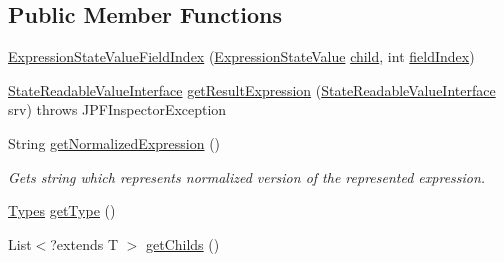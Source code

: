 \subsection*{Public Member Functions}
\begin{DoxyCompactItemize}
\item 
\hyperlink{classgov_1_1nasa_1_1jpf_1_1inspector_1_1server_1_1expression_1_1expressions_1_1_expression_state_value_field_index_ac1c21fbe3db4e864eca080940150d01b}{Expression\+State\+Value\+Field\+Index} (\hyperlink{classgov_1_1nasa_1_1jpf_1_1inspector_1_1server_1_1expression_1_1expressions_1_1_expression_state_value}{Expression\+State\+Value} \hyperlink{classgov_1_1nasa_1_1jpf_1_1inspector_1_1server_1_1expression_1_1_expression_state_unary_operator_a66041b1f569a361549e28a00f7ca5f2f}{child}, int \hyperlink{classgov_1_1nasa_1_1jpf_1_1inspector_1_1server_1_1expression_1_1expressions_1_1_expression_state_value_field_index_a73e1be57f920f5d0fd849d0d734ccf6a}{field\+Index})
\item 
\hyperlink{interfacegov_1_1nasa_1_1jpf_1_1inspector_1_1server_1_1programstate_1_1_state_readable_value_interface}{State\+Readable\+Value\+Interface} \hyperlink{classgov_1_1nasa_1_1jpf_1_1inspector_1_1server_1_1expression_1_1expressions_1_1_expression_state_value_field_index_a7e66eb5e8b5055f000db75aeecae7c35}{get\+Result\+Expression} (\hyperlink{interfacegov_1_1nasa_1_1jpf_1_1inspector_1_1server_1_1programstate_1_1_state_readable_value_interface}{State\+Readable\+Value\+Interface} srv)  throws J\+P\+F\+Inspector\+Exception 
\item 
String \hyperlink{classgov_1_1nasa_1_1jpf_1_1inspector_1_1server_1_1expression_1_1expressions_1_1_expression_state_value_field_index_a27a15a9a4ea2cc283d8fe9c00f2a6a6f}{get\+Normalized\+Expression} ()
\begin{DoxyCompactList}\small\item\em Gets string which represents normalized version of the represented expression. \end{DoxyCompactList}\item 
\hyperlink{enumgov_1_1nasa_1_1jpf_1_1inspector_1_1server_1_1expression_1_1_types}{Types} \hyperlink{classgov_1_1nasa_1_1jpf_1_1inspector_1_1server_1_1expression_1_1expressions_1_1_expression_state_value_a9317f49f60c166a2f46f90702e75f22e}{get\+Type} ()
\item 
List$<$?extends T $>$ \hyperlink{classgov_1_1nasa_1_1jpf_1_1inspector_1_1server_1_1expression_1_1_expression_state_unary_operator_ad010bcb9c4e2eb584321b5ceba8e1682}{get\+Childs} ()
\end{DoxyCompactItemize}
